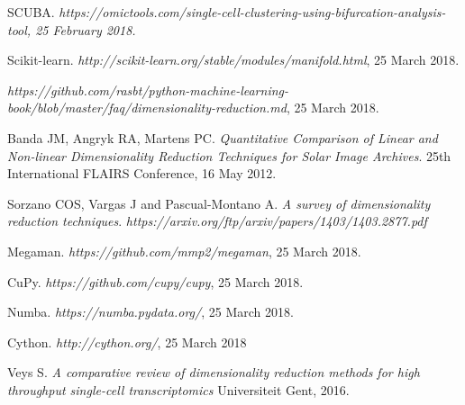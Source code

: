 \documentclass[journal, a4paper]{IEEEtran}
\begin{document}
\begin{thebibliography}{99}
	SCUBA.
	\textit{https://omictools.com/single-cell-clustering-using-bifurcation-analysis-tool, 25 February 2018.}
	
	Scikit-learn.
	\textit{http://scikit-learn.org/stable/modules/manifold.html}, 25 March 2018.
	
	\textit{https://github.com/rasbt/python-machine-learning-book/blob/master/faq/dimensionality-reduction.md}, 25 March 2018.
	
	Banda JM, Angryk RA, Martens PC. \textit{Quantitative Comparison of Linear and Non-linear Dimensionality Reduction Techniques for Solar Image Archives}.
	25th International FLAIRS Conference, 16 May 2012.
	
	Sorzano COS, Vargas J and Pascual-Montano A. \textit{A survey of dimensionality reduction techniques}.
	\textit{https://arxiv.org/ftp/arxiv/papers/1403/1403.2877.pdf}
	
	Megaman.
	\textit{https://github.com/mmp2/megaman}, 25 March 2018.
	
	CuPy.
	\textit{https://github.com/cupy/cupy}, 25 March 2018.
	
	Numba.
	\textit{https://numba.pydata.org/}, 25 March 2018.

	Cython.
	\textit{http://cython.org/}, 25 March 2018
	
	Veys S. \textit{A comparative review of dimensionality reduction methods for high throughput single-cell transcriptomics}
	Universiteit Gent, 2016.

	

	
	
\end{thebibliography}

\end{document}
